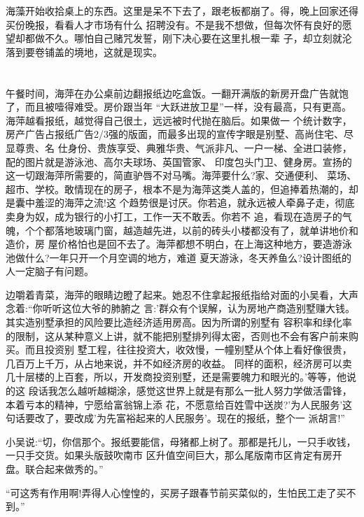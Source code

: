\documentclass[11pt,a4paper,onecolumn]{article}
\begin{document}
海藻开始收拾桌上的东西。这里是呆不下去了，跟老板都崩了。得，晚上回家还得买份晚报，看看人才市场有什么
招聘没有。不是我不想做，但每次怀有良好的愿望却都做不久。哪怕自己赌咒发誓，刚下决心要在这里扎根一辈
子，却立刻就沦落到要卷铺盖的境地，这就是现实。

\section[\thesection]{}

午餐时间，海萍在办公桌前边翻报纸边吃盒饭。一翻开满版的新房开盘广告就饱了，而且被噎得难受。房价跟当年
``大跃进放卫星''一样，没有最高，只有更高。海萍越看报纸，越觉得自己很土，远远被时代抛在脑后。如果做一
个统计数字，房产广告占报纸广告2/3强的版面，而最多出现的宣传字眼是\myrule 别墅、高尚住宅、尽显尊贵、名
仕身份、贵族享受、典雅华贵、气派非凡、一户一梯、全进口装修，配的图片就是游泳池、高尔夫球场、英国管家、
印度包头门卫、健身房。宣扬的这一切跟海萍所需要的，简直驴唇不对马嘴。海萍要什么?\myrule 家、交通便利、
菜场、超市、学校。敢情现在的房子，根本不是为海萍这类人盖的，但追捧着热潮的，却是囊中羞涩的海萍之流!这
个趋势很是讨厌。你若追，就永远被人牵鼻子走，彻底卖身为奴，成为银行的小打工，工作一天不敢丢。你若不
追，看现在造房子的气魄，个个都落地玻璃门窗，越造越先进，以前的砖头小楼都没有了，就单讲地价和造价，房
屋价格怕也是回不去了。海萍都想不明白，在上海这种地方，要造游泳池做什么?一年只开一个月空调的地方，难道
夏天游泳，冬天养鱼么?设计图纸的人一定脑子有问题。

边嚼着青菜，海萍的眼睛边瞪了起来。她忍不住拿起报纸指给对面的小吴看，大声念着:``你听听这位大爷的肺腑之
言:'群众有个误解，认为房地产商造别墅赚大钱。其实造别墅承担的风险要比造经济适用房高。因为所谓的别墅有
容积率和绿化率的限制，这从某种意义上讲，就不能把别墅排列得太密，否则也不会有客户前来购买。而且投资别
墅工程，往往投资大，收效慢，一幢别墅从个体上看好像很贵，几百万上千万，从占地来说，并不如经济房的收益。
同样的面积，经济房可以卖几十层楼的上百套，所以，开发商投资别墅，还是需要魄力和眼光的。'等等，他说的这
段话我怎么越听越糊涂，感觉这世界上就是有那么一批人努力学做活雷锋，本着亏本的精神，宁愿给富翁锦上添
花，不愿意给百姓雪中送炭?'为人民服务'这句话要改了，要改成'为先富裕起来的人民服务'。现在的报纸，整个一
派胡言!''

小吴说:``切，你信那个。报纸要能信，母猪都上树了。那都是托儿，一只手收钱，一只手交货。如果头版鼓吹南市
区升值空间巨大，那么尾版南市区肯定有房开盘。联合起来做秀的。''

``可这秀有作用啊!弄得人心惶惶的，买房子跟春节前买菜似的，生怕民工走了买不到。''
\end{document}
